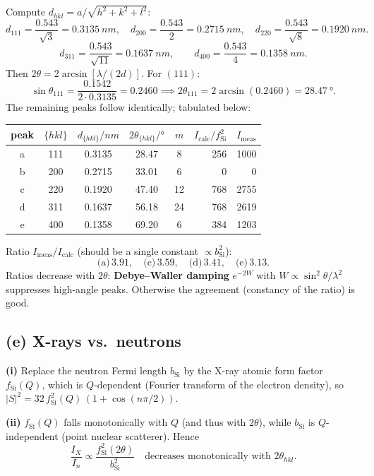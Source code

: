 \documentclass[11pt]{article}
\begin{document}
Compute $d_{hkl} = a/\sqrt{h^2+k^2+l^2}$:
\[
d_{111} = \frac{0.543}{\sqrt{3}} = \SI{0.3135}{nm},\quad d_{200} = \frac{0.543}{2} = \SI{0.2715}{nm},\quad d_{220} = \frac{0.543}{\sqrt{8}} = \SI{0.1920}{nm}.
\]
\[
d_{311} = \frac{0.543}{\sqrt{11}} = \SI{0.1637}{nm},\qquad d_{400} = \frac{0.543}{4} = \SI{0.1358}{nm}.
\]
Then $2\theta = 2\arcsin[\lambda/(2d)]$. For $(111)$:
\[
\sin\theta_{111} = \frac{0.1542}{2\cdot 0.3135} = 0.2460 \implies 2\theta_{111} = 2\arcsin(0.2460) = \SI{28.47}{\degree}.
\]
The remaining peaks follow identically; tabulated below:

\begin{center}
\begin{tabular}{cccccrr}
\toprule
peak & $\{hkl\}$ & $d_{\{hkl\}}/\si{nm}$ & $2\theta_{\{hkl\}}/\si{\degree}$ & $m$ & $I_\text{calc}/f_\text{Si}^2$ & $I_\text{meas}$ \\
\midrule
a & 111 & 0.3135 & 28.47 & 8  & 256  & 1000 \\
b & 200 & 0.2715 & 33.01 & 6  & 0    & 0    \\
c & 220 & 0.1920 & 47.40 & 12 & 768  & 2755 \\
d & 311 & 0.1637 & 56.18 & 24 & 768  & 2619 \\
e & 400 & 0.1358 & 69.20 & 6  & 384  & 1203 \\
\bottomrule
\end{tabular}
\end{center}

Ratio $I_\text{meas}/I_\text{calc}$ (should be a single constant $\propto b_\text{Si}^2$):
\[
\text{(a)}\,3.91,\quad\text{(c)}\,3.59,\quad\text{(d)}\,3.41,\quad\text{(e)}\,3.13.
\]
Ratios decrease with $2\theta$: \textbf{Debye--Waller damping} $e^{-2W}$ with $W\propto \sin^2\theta/\lambda^2$ suppresses high-angle peaks. Otherwise the agreement (constancy of the ratio) is good.

\subsection*{(e) X-rays vs.\ neutrons}

\textbf{(i)} Replace the neutron Fermi length $b_\text{Si}$ by the X-ray atomic form factor $f_\text{Si}(Q)$, which is $Q$-dependent (Fourier transform of the electron density), so $|S|^2 = 32\, f_\text{Si}^2(Q)\,(1+\cos(n\pi/2))$.

\textbf{(ii)} $f_\text{Si}(Q)$ falls monotonically with $Q$ (and thus with $2\theta$), while $b_\text{Si}$ is $Q$-independent (point nuclear scatterer). Hence
\[
\boxed{\;\frac{I_X}{I_n}\propto\frac{f_\text{Si}^2(2\theta)}{b_\text{Si}^2}\quad\text{decreases monotonically with }2\theta_{hkl}.\;}
\]
\end{document}
